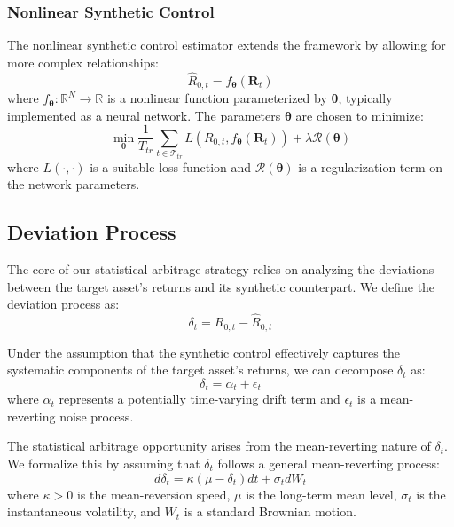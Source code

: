\subsubsection{Nonlinear Synthetic Control}

The nonlinear synthetic control estimator extends the framework by allowing for more complex relationships:
\begin{equation}
    \hat{R}_{0,t} = f_{\boldsymbol{\theta}}(\mathbf{R}_t)
\end{equation}
where $f_{\boldsymbol{\theta}}: \mathbb{R}^N \rightarrow \mathbb{R}$ is a nonlinear function parameterized by $\boldsymbol{\theta}$, typically implemented as a neural network. The parameters $\boldsymbol{\theta}$ are chosen to minimize:
\begin{equation}
    \min_{\boldsymbol{\theta}} \frac{1}{T_{tr}}\sum_{t\in\mathcal{T}_{tr}} L(R_{0,t}, f_{\boldsymbol{\theta}}(\mathbf{R}_t)) + \lambda\mathcal{R}(\boldsymbol{\theta})
\end{equation}
where $L(\cdot,\cdot)$ is a suitable loss function and $\mathcal{R}(\boldsymbol{\theta})$ is a regularization term on the network parameters.

\subsection{Deviation Process}

The core of our statistical arbitrage strategy relies on analyzing the deviations between the target asset's returns and its synthetic counterpart. We define the deviation process as:
\begin{equation}
    \delta_t = R_{0,t} - \hat{R}_{0,t}
\end{equation}

Under the assumption that the synthetic control effectively captures the systematic components of the target asset's returns, we can decompose $\delta_t$ as:
\begin{equation}
    \delta_t = \alpha_t + \epsilon_t
\end{equation}
where $\alpha_t$ represents a potentially time-varying drift term and $\epsilon_t$ is a mean-reverting noise process.

The statistical arbitrage opportunity arises from the mean-reverting nature of $\delta_t$. We formalize this by assuming that $\delta_t$ follows a general mean-reverting process:
\begin{equation}
    d\delta_t = \kappa(\mu - \delta_t)dt + \sigma_t dW_t
\end{equation}
where $\kappa > 0$ is the mean-reversion speed, $\mu$ is the long-term mean level, $\sigma_t$ is the instantaneous volatility, and $W_t$ is a standard Brownian motion.

